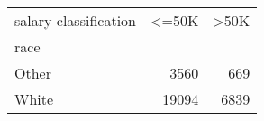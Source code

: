 \begin{tabular}{lrr}
\toprule
salary-classification &   <=50K &   >50K \\
race  &         &        \\
\midrule
Other &    3560 &    669 \\
White &   19094 &   6839 \\
\bottomrule
\end{tabular}

